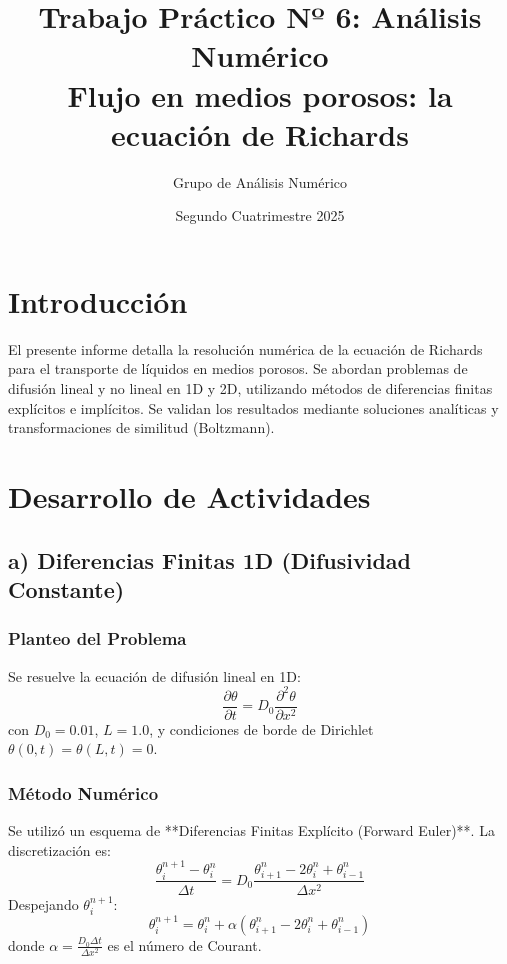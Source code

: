 \documentclass[a4paper,12pt]{article}
\title{\textbf{Trabajo Práctico Nº 6: Análisis Numérico}\\
\large Flujo en medios porosos: la ecuación de Richards}
\author{Grupo de Análisis Numérico}
\date{Segundo Cuatrimestre 2025}
\begin{document}
\maketitle

\section{Introducción}
El presente informe detalla la resolución numérica de la ecuación de Richards para el transporte de líquidos en medios porosos. Se abordan problemas de difusión lineal y no lineal en 1D y 2D, utilizando métodos de diferencias finitas explícitos e implícitos. Se validan los resultados mediante soluciones analíticas y transformaciones de similitud (Boltzmann).

\section{Desarrollo de Actividades}

\subsection{a) Diferencias Finitas 1D (Difusividad Constante)}

\subsubsection*{Planteo del Problema}
Se resuelve la ecuación de difusión lineal en 1D:
\begin{equation}
    \frac{\partial\theta}{\partial t} = D_0 \frac{\partial^2\theta}{\partial x^2}
\end{equation}
con $D_0 = 0.01$, $L=1.0$, y condiciones de borde de Dirichlet $\theta(0,t)=\theta(L,t)=0$.

\subsubsection*{Método Numérico}
Se utilizó un esquema de **Diferencias Finitas Explícito (Forward Euler)**. La discretización es:
\begin{equation}
    \frac{\theta_i^{n+1} - \theta_i^n}{\Delta t} = D_0 \frac{\theta_{i+1}^n - 2\theta_i^n + \theta_{i-1}^n}{\Delta x^2}
\end{equation}
Despejando $\theta_i^{n+1}$:
\begin{equation}
    \theta_i^{n+1} = \theta_i^n + \alpha (\theta_{i+1}^n - 2\theta_i^n + \theta_{i-1}^n)
\end{equation}
donde $\alpha = \frac{D_0 \Delta t}{\Delta x^2}$ es el número de Courant.
\end{document}
